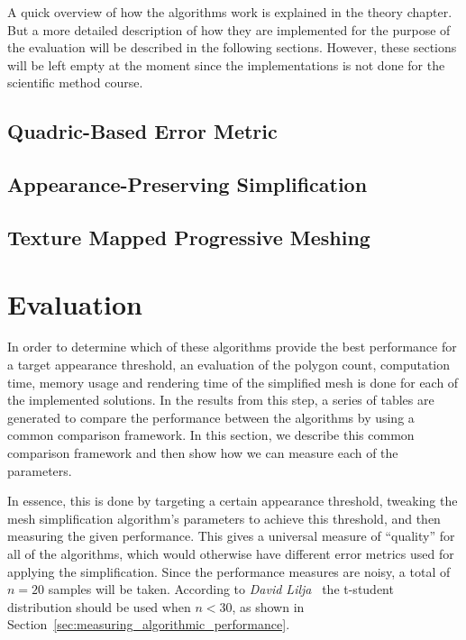     A quick overview of how the algorithms work is explained in the theory chapter. But a more detailed description of how they are implemented for the purpose of the evaluation will be described in the following sections. However, these sections will be left empty at the moment since the implementations is not done for the scientific method course.

        \subsection{Quadric-Based Error Metric} \label{sub:quadric-based_error_metric}

        \subsection{Appearance-Preserving Simplification} \label{sub:appearance-preserving_simplification}

        \subsection{Texture Mapped Progressive Meshing} \label{sub:texture_mapped_progressive_meshing}

    \newpage

    \section{Evaluation} \label{sec:evaluation}

        In order to determine which of these algorithms provide the best performance for a target appearance threshold, an evaluation of the polygon count, computation time, memory usage and rendering time of the simplified mesh is done for each of the implemented solutions. In the results from this step, a series of tables are generated to compare the performance between the algorithms by using a common comparison framework. In this section, we describe this common comparison framework and then show how we can measure each of the parameters.

        In essence, this is done by targeting a certain appearance threshold, tweaking the mesh simplification algorithm's parameters to achieve this threshold, and then measuring the given performance. This gives a universal measure of ``quality'' for all of the algorithms, which would otherwise have different error metrics used for applying the simplification. Since the performance measures are noisy, a total of \(n=20\) samples will be taken. According to \emph{David Lilja}~\cite[p.~50]{lilja2005measuring} the t-student distribution should be used when \(n < 30\), as shown in Section~\ref{sec:measuring_algorithmic_performance}.

